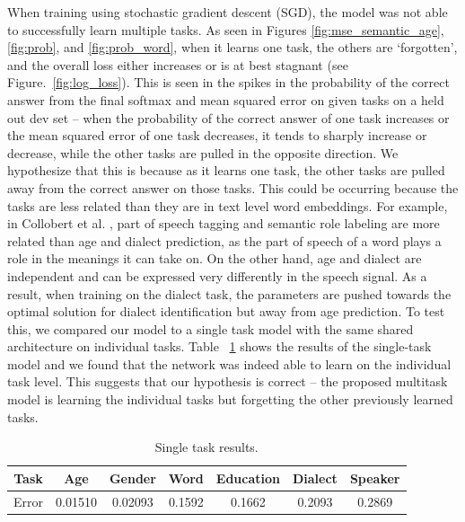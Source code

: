 \documentclass{article}
\begin{document}
When training using stochastic gradient descent (SGD), the model was not able to successfully learn multiple tasks.  As seen in Figures \ref{fig:mse_semantic_age}, \ref{fig:prob}, and \ref{fig:prob_word}, when it learns one task, the others are `forgotten', and the overall loss either increases or is at best stagnant (see Figure.~\ref{fig:log_loss}).  This is seen in the spikes in the probability of the correct answer from the final softmax and mean squared error on given tasks on a held out dev set -- when the probability of the correct answer of one task increases or the mean squared error of one task decreases, it tends to sharply increase or decrease, while the other tasks are pulled in the opposite direction.  We hypothesize that this is because as it learns one task, the other tasks are pulled away from the correct answer on those tasks.  This could be occurring because the tasks are less related than they are in text level word embeddings.  For example, in Collobert et al. \citep{collobert2008unified}, part of speech tagging and semantic role labeling are more related than age and dialect prediction, as the part of speech of a word plays a role in the meanings it can take on.  On the other hand, age and dialect are independent and can be expressed very differently in the speech signal. As a result, when training on the dialect task, the parameters are pushed towards the optimal solution for dialect identification but away from age prediction. To test this, we compared our model to a single task model with the same shared architecture on individual tasks. Table ~\ref{tab:single_task_resul} shows the results of the single-task model and we found that the network was indeed able to learn on the individual task level.  This suggests that our hypothesis is correct -- the proposed multitask model is learning the individual tasks but forgetting the other previously learned tasks.

\begin{table}[h!]
\centering
\caption{Single task results.}
\label{tab:single_task_resul}
\begin{tabular}{c|cccccc}
\hline
Task & Age & Gender & Word & Education & Dialect & Speaker \\ \hline
Error &  0.01510 & 0.02093 & 0.1592 & 0.1662 & 0.2093 & 0.2869 \\ \hline
\end{tabular}
\end{table}
\end{document}
